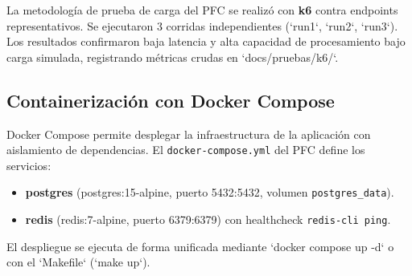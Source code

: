 La metodología de prueba de carga del PFC se realizó con \textbf{k6} contra endpoints representativos. Se ejecutaron
3 corridas independientes (`run1`, `run2`, `run3`). Los resultados confirmaron baja latencia y alta capacidad de
procesamiento bajo carga simulada, registrando métricas crudas en `docs/pruebas/k6/`.

\subsection{Containerización con Docker Compose}

Docker Compose permite desplegar la infraestructura de la aplicación con aislamiento de dependencias. El
\texttt{docker-compose.yml} del PFC define los servicios:
\begin{itemize}
    \item \textbf{postgres} (postgres:15-alpine, puerto 5432:5432, volumen \texttt{postgres\_data}).
    \item \textbf{redis} (redis:7-alpine, puerto 6379:6379) con healthcheck \texttt{redis-cli ping}.
\end{itemize}

El despliegue se ejecuta de forma unificada mediante `docker compose up -d` o con el `Makefile` (`make up`).
